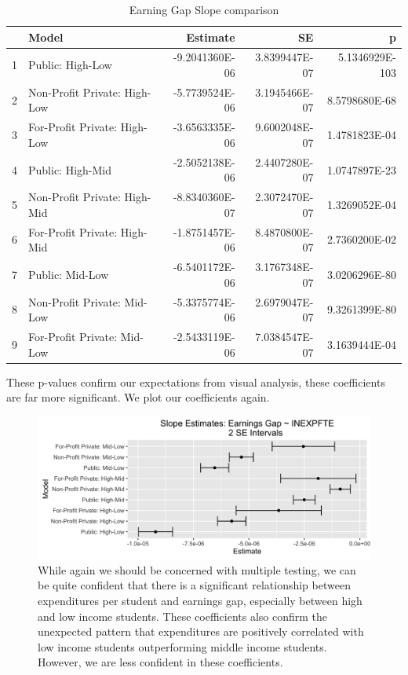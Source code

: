 \documentclass{article}
\begin{document}
\begin{table}[ht]
\centering
\caption{Earning Gap Slope comparison} 
\begin{tabular}{rlrrr}
  \hline
 & Model & Estimate & SE & p \\ 
  \hline
1 & Public: High-Low & -9.2041360E-06 & 3.8399447E-07 & 5.1346929E-103 \\ 
  2 & Non-Profit Private: High-Low & -5.7739524E-06 & 3.1945466E-07 & 8.5798680E-68 \\ 
  3 & For-Profit Private: High-Low & -3.6563335E-06 & 9.6002048E-07 & 1.4781823E-04 \\ 
  4 & Public: High-Mid & -2.5052138E-06 & 2.4407280E-07 & 1.0747897E-23 \\ 
  5 & Non-Profit Private: High-Mid & -8.8340360E-07 & 2.3072470E-07 & 1.3269052E-04 \\ 
  6 & For-Profit Private: High-Mid & -1.8751457E-06 & 8.4870800E-07 & 2.7360200E-02 \\ 
  7 & Public: Mid-Low & -6.5401172E-06 & 3.1767348E-07 & 3.0206296E-80 \\ 
  8 & Non-Profit Private: Mid-Low & -5.3375774E-06 & 2.6979047E-07 & 9.3261399E-80 \\ 
  9 & For-Profit Private: Mid-Low & -2.5433119E-06 & 7.0384547E-07 & 3.1639444E-04 \\ 
   \hline
\end{tabular}
\end{table}
These p-values confirm our expectations from visual analysis, these coefficients are far more significant. We plot our coefficients again.

\begin{figure}[H]
\centering
\includegraphics[width=1\textwidth]{../images/earnings_gaps_results.png}
\caption{\label{fig: earnings_gaps_table} While again we should be concerned with multiple testing, we can be quite confident that there is a significant relationship between expenditures per student and earnings gap, especially between high and low income students. These coefficients also confirm the unexpected pattern that expenditures are positively correlated with low income students outperforming middle income students. However, we are less confident in these coefficients.}
\end{figure}
\end{document}
